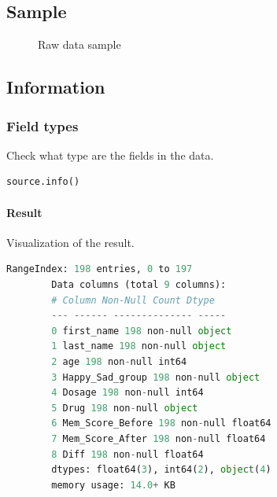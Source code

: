 \documentclass{article}
\begin{document}
    \subsection{Sample}
    \begin{figure}[!htb]
        \caption{\label{fig:raw-data-sample} Raw data sample}
    \end{figure}
    \newpage
    \subsection{Information}
    \subsubsection{Field types} Check what type are the fields in the data.
    \begin{lstlisting}[language=Python]
        source.info()
    \end{lstlisting}
    \paragraph{Result} Visualization of the result.
    \begin{lstlisting}[language=Python]
        RangeIndex: 198 entries, 0 to 197
        Data columns (total 9 columns):
        # Column Non-Null Count Dtype
        --- ------ -------------- -----
        0 first_name 198 non-null object
        1 last_name 198 non-null object
        2 age 198 non-null int64
        3 Happy_Sad_group 198 non-null object
        4 Dosage 198 non-null int64
        5 Drug 198 non-null object
        6 Mem_Score_Before 198 non-null float64
        7 Mem_Score_After 198 non-null float64
        8 Diff 198 non-null float64
        dtypes: float64(3), int64(2), object(4)
        memory usage: 14.0+ KB
    \end{lstlisting}
\end{document}
